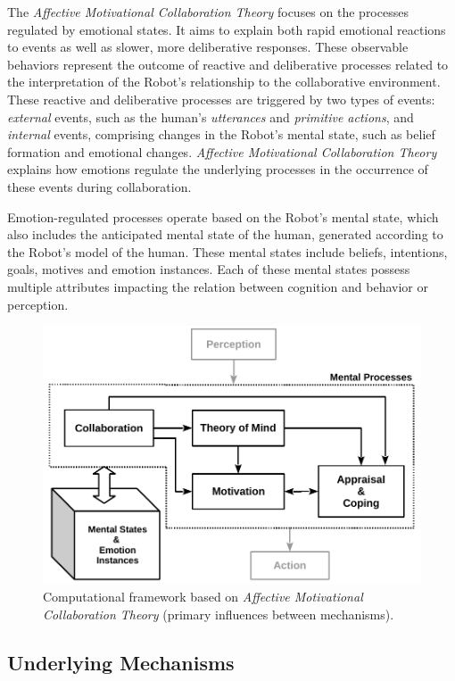 The \textit{Affective Motivational Collaboration Theory} focuses on the
processes regulated by emotional states. It aims to explain both rapid emotional
reactions to events as well as slower, more deliberative responses. These
observable behaviors represent the outcome of reactive and deliberative
processes related to the interpretation of the Robot's relationship to the
collaborative environment. These reactive and deliberative processes are
triggered by two types of events: \textit{external} events, such as the human's
\textit{utterances} and \textit{primitive actions}, and \textit{internal}
events, comprising changes in the Robot's mental state, such as belief formation
and emotional changes. \textit{Affective Motivational Collaboration Theory}
explains how emotions regulate the underlying processes in the occurrence of
these events during collaboration.

Emotion-regulated processes operate based on the Robot's mental state, which
also includes the anticipated mental state of the human, generated according to
the Robot's model of the human. These mental states include beliefs, intentions,
goals, motives and emotion instances. Each of these mental states possess
multiple attributes impacting the relation between cognition and behavior or
perception.

\begin{figure}[h!]
  \includegraphics[scale=0.78]{figure/theory-general-croped.pdf}
  \caption{Computational framework based on \textit{Affective Motivational
  Collaboration Theory} (primary influences between mechanisms).}
  \label{fig:theory}
\end{figure}

\subsection{Underlying Mechanisms}
\label{sec:mechanisms}

